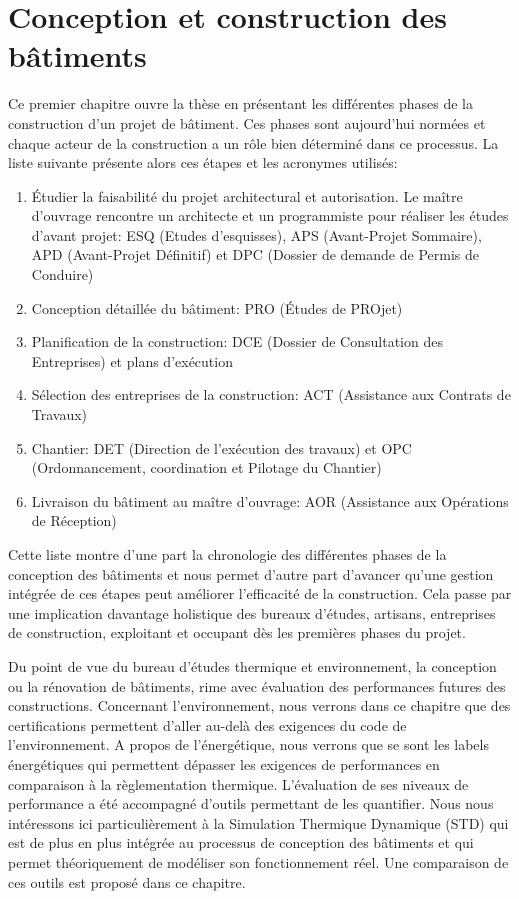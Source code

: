\chapter{Conception et construction des bâtiments}

Ce premier chapitre ouvre la thèse en présentant les différentes phases de la construction d'un projet de bâtiment. Ces phases sont aujourd'hui normées et chaque acteur de la construction a un rôle bien déterminé dans ce processus. La liste suivante présente alors ces étapes et les acronymes utilisés:

\begin{enumerate}
  \item Étudier la faisabilité du projet architectural et autorisation. Le maître d'ouvrage rencontre un architecte et un programmiste pour réaliser les études d'avant projet: ESQ (Etudes d'esquisses), APS (Avant-Projet Sommaire), APD (Avant-Projet Définitif) et DPC (Dossier de demande de Permis de Conduire)
  \item Conception détaillée du bâtiment: PRO (Études de PROjet)
  \item Planification de la construction: DCE (Dossier de Consultation des Entreprises) et plans d'exécution
  \item Sélection des entreprises de la construction: ACT (Assistance aux Contrats de Travaux)
  \item Chantier: DET (Direction de l'exécution des travaux) et OPC (Ordonnancement, coordination et Pilotage du Chantier)
  \item Livraison du bâtiment au maître d'ouvrage: AOR (Assistance aux Opérations de Réception)
\end{enumerate}

Cette liste montre d'une part la chronologie des différentes phases de la conception des bâtiments et nous permet d'autre part d'avancer qu'une gestion intégrée de ces étapes peut améliorer l'efficacité de la construction. Cela passe par une implication davantage holistique des bureaux d'études, artisans, entreprises de construction, exploitant et occupant dès les premières phases du projet.

Du point de vue du bureau d'études thermique et environnement, la conception ou la rénovation de bâtiments, rime avec évaluation des performances futures des constructions. Concernant l'environnement, nous verrons dans ce chapitre que des certifications permettent d'aller au-delà des exigences du code de l'environnement. A propos de l'énergétique, nous verrons que se sont les labels énergétiques qui permettent dépasser les exigences de performances en comparaison à la règlementation thermique. L'évaluation de ses niveaux de performance a été accompagné d'outils permettant de les quantifier. Nous nous intéressons ici particulièrement à la Simulation Thermique Dynamique (STD) qui est de plus en plus intégrée au processus de conception des bâtiments et qui permet théoriquement de modéliser son fonctionnement réel. Une comparaison de ces outils est proposé dans ce chapitre.

